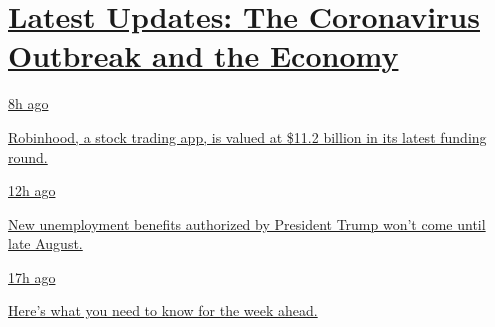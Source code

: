 \hypertarget{latest-updates-the-coronavirus-outbreak-and-the-economy}{%
\section{\texorpdfstring{\href{https://www.nytimes3xbfgragh.onion/live/2020/08/17/business/stock-market-today-coronavirus?action=click\&pgtype=Article\&state=default\&region=MAIN_CONTENT_1\&context=storylines_live_updates}{Latest
Updates: The Coronavirus Outbreak and the
Economy}}{Latest Updates: The Coronavirus Outbreak and the Economy}}\label{latest-updates-the-coronavirus-outbreak-and-the-economy}}

\href{https://www.nytimes3xbfgragh.onion/live/2020/08/17/business/stock-market-today-coronavirus?action=click\&pgtype=Article\&state=default\&region=MAIN_CONTENT_1\&context=storylines_live_updates\#robinhood-a-stock-trading-app-is-valued-at-11-2-billion-in-its-latest-funding-round}{8h
ago}

\href{https://www.nytimes3xbfgragh.onion/live/2020/08/17/business/stock-market-today-coronavirus?action=click\&pgtype=Article\&state=default\&region=MAIN_CONTENT_1\&context=storylines_live_updates\#robinhood-a-stock-trading-app-is-valued-at-11-2-billion-in-its-latest-funding-round}{Robinhood,
a stock trading app, is valued at \$11.2 billion in its latest funding
round.}

\href{https://www.nytimes3xbfgragh.onion/live/2020/08/17/business/stock-market-today-coronavirus?action=click\&pgtype=Article\&state=default\&region=MAIN_CONTENT_1\&context=storylines_live_updates\#new-unemployment-benefits-authorized-by-president-trump-wont-come-until-late-august}{12h
ago}

\href{https://www.nytimes3xbfgragh.onion/live/2020/08/17/business/stock-market-today-coronavirus?action=click\&pgtype=Article\&state=default\&region=MAIN_CONTENT_1\&context=storylines_live_updates\#new-unemployment-benefits-authorized-by-president-trump-wont-come-until-late-august}{New
unemployment benefits authorized by President Trump won't come until
late August.}

\href{https://www.nytimes3xbfgragh.onion/live/2020/08/17/business/stock-market-today-coronavirus?action=click\&pgtype=Article\&state=default\&region=MAIN_CONTENT_1\&context=storylines_live_updates\#heres-what-you-need-to-know-for-the-week-ahead}{17h
ago}

\href{https://www.nytimes3xbfgragh.onion/live/2020/08/17/business/stock-market-today-coronavirus?action=click\&pgtype=Article\&state=default\&region=MAIN_CONTENT_1\&context=storylines_live_updates\#heres-what-you-need-to-know-for-the-week-ahead}{Here's
what you need to know for the week ahead.}

